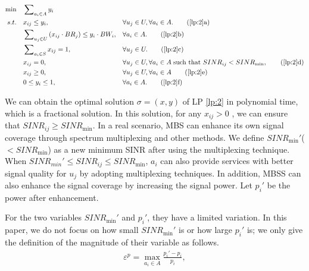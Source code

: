 \documentclass[11pt,a4paper]{article}
\begin{document}
\begin{align}
	\min \quad & \sum\nolimits_{{a_i} \in A} {{y_i}}&&  \label{lp:2}\\
	s.t.\quad &  {x_{ij}} \le {y_i},&&\forall {u_j} \in U,\forall {a_i} \in A. \tag{\ref{lp:2}{a}}\label{lp:2.1}\\
	&  \sum\nolimits_{{u_j} \in U} {({x_{ij}} \cdot B{R_j})}  \le {y_i} \cdot B{W_i},&&\forall {a_i} \in A. \tag{\ref{lp:2}{b}}\label{lp:2.2}\\
	&  \sum\nolimits_{{a_i} \in S} {{x_{ij}}}  = 1,&&\forall {u_j} \in U. \tag{\ref{lp:2}{c}}\label{lp:2.3}\\
	&  {x_{ij}} = 0,&&\forall {u_j} \in U,\forall {a_i} \in A\;{\text{such that }}SIN{R_{ij}} < SIN{R_{\min }}, \tag{\ref{lp:2}{d}}\label{lp:2.4}\\
	&  {x_{ij}} \ge 0,&&\forall u_j \in U,\forall {a_i} \in A \tag{\ref{lp:2}{e}}\label{lp:2.5}\\
	&  0 \le {y_i} \le 1,&&\forall {a_i} \in A. \tag{\ref{lp:2}{f}}\label{lp:2.6}
\end{align}

We can obtain the optimal solution $\sigma=(x,y)$ of LP \ref{lp:2} in polynomial time, which is a fractional solution. In this solution, for any $x_{ij}>0$ , we can ensure that $SINR_{ij}\ge SINR_{\min}$. In a real scenario, MBS can enhance its own signal coverage through spectrum multiplexing and other methods. We define $SINR_{\min}'$($<SINR_{\min}$) as a new minimum SINR after using the multiplexing technique. When $SINR_{min}' \le SINR_{ij} \le SINR_{\min}$, $a_i$ can also provide services with better signal quality for $u_j$ by adopting multiplexing techniques. In addition, MBSS can also enhance the signal coverage by increasing the signal power. Let $p_i'$ be the power after enhancement.


For the two variables $SINR_{\min}'$ and $p_i'$, they have a limited variation. In this paper, we do not focus on how small $SINR_{\min}'$ is or how large $p_i'$ is; we only give the definition of the magnitude of their variable as follows.
\begin{eqnarray}
	{\varepsilon ^p} = \mathop {\max }\limits_{{a_i} \in A} \frac{{{p_i}' - {p_i}}}{{{p_i}}},
\end{eqnarray}
\end{document}
